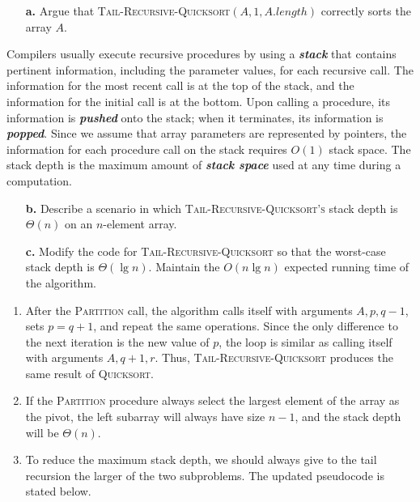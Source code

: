 \begin{enumerate}
{\begin{enumerate}
\item[\textbf{a.}]{Argue that \textsc{Tail-Recursive-Quicksort}$(A, 1,
A.length)$ correctly sorts the array $A$.}
\end{enumerate}

Compilers usually execute recursive procedures by using a \textbf{\emph{stack}}
that contains pertinent information, including the parameter values, for each
recursive call. The information for the most recent call is at the top of the
stack, and the information for the initial call is at the bottom. Upon calling
a procedure, its information is \textbf{\emph{pushed}} onto the stack; when it
terminates, its information is \textbf{\emph{popped}}. Since we assume that
array parameters are represented by pointers, the information for each procedure
call on the stack requires $O(1)$ stack space. The stack depth is the maximum
amount of \textbf{\emph{stack space}} used at any time during a computation.

\begin{enumerate}
\item[\textbf{b.}]{Describe a scenario in which
\textsc{Tail-Recursive-Quicksort's} stack depth is $\Theta(n)$ on an
$n$-element array.}

\item[\textbf{c.}]{Modify the code for \textsc{Tail-Recursive-Quicksort} so that
the worst-case stack depth is $\Theta(\lg n)$. Maintain the $O(n \lg n)$
expected running time of the algorithm.}
\end{enumerate}
}

\begin{framed}
\begin{enumerate}
\item{After the \textsc{Partition} call, the algorithm calls itself with
arguments $A, p, q - 1$, sets $p = q + 1$, and repeat the same operations. Since
the only difference to the next iteration is the new value of $p$, the loop
is similar as calling itself with arguments $A, q + 1, r$. Thus,
\textsc{Tail-Recursive-Quicksort}} produces the same result of
\textsc{Quicksort}.
\item{If the \textsc{Partition} procedure always select the largest element of
the array as the pivot, the left subarray will always have size $n - 1$, and the
stack depth will be $\Theta(n)$.}
\item{To reduce the maximum stack depth, we should always give to the tail
recursion the larger of the two subproblems. The updated pseudocode is stated
below.

}
\end{enumerate}
\end{framed}
\end{enumerate}
